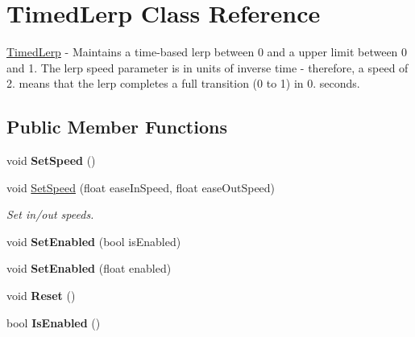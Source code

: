 \hypertarget{class_timed_lerp}{}\section{Timed\+Lerp Class Reference}
\label{class_timed_lerp}


\mbox{\hyperlink{class_timed_lerp}{Timed\+Lerp}} -\/ Maintains a time-\/based lerp between 0 and a upper limit between 0 and 1. The lerp speed parameter is in units of inverse time -\/ therefore, a speed of 2. means that the lerp completes a full transition (0 to 1) in 0. seconds.  


\subsection*{Public Member Functions}
\begin{DoxyCompactItemize}
\item 
\mbox{\label{class_timed_lerp_afd112ddd79c1dca6b8eed43fe8e8bf17}} 
void {\bfseries Set\+Speed} ()
\item 
\mbox{\label{class_timed_lerp_a6a196647bd9dc81dedb9171b7a77ad75}} 
void \mbox{\hyperlink{class_timed_lerp_a6a196647bd9dc81dedb9171b7a77ad75}{Set\+Speed}} (float ease\+In\+Speed, float ease\+Out\+Speed)
\begin{DoxyCompactList}\small\item\em Set in/out speeds. \end{DoxyCompactList}\item 
\mbox{\label{class_timed_lerp_aa3ea68ee9fc2e65a1b023b82f8104fd4}} 
void {\bfseries Set\+Enabled} (bool is\+Enabled)
\item 
\mbox{\label{class_timed_lerp_a6b0d6401a371c4596da83f3ba3379bdd}} 
void {\bfseries Set\+Enabled} (float enabled)
\item 
\mbox{\label{class_timed_lerp_a6771a3babe6ccdc179962799b38a764f}} 
void {\bfseries Reset} ()
\item 
\mbox{\label{class_timed_lerp_a588b7b9530791c1b8b62a680423507ec}} 
bool {\bfseries Is\+Enabled} ()
\item 
\mbox{\label{class_timed_lerp_abfe1bf353d18a0fed4c9c83a665aa2fd}} 

\end{DoxyCompactItemize}
